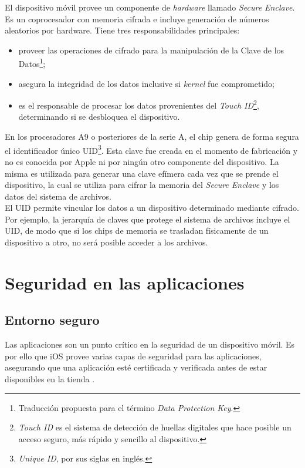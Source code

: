 El dispositivo móvil provee un componente de \textit{hardware} llamado \textit{Secure Enclave}. Es un coprocesador con memoria cifrada e incluye generación de números aleatorios por hardware. Tiene tres responsabilidades principales:
\begin{itemize}
    \item proveer las operaciones de cifrado para la manipulación de la Clave de los Datos\footnote{Traducción propuesta para el término \textit{Data Protection Key}.};
    \item asegura la integridad de los datos inclusive si \textit{kernel} fue comprometido;
    \item es el responsable de procesar los datos provenientes del \textit{Touch ID}\footnote{\textit{Touch ID} es el sistema de detección de huellas digitales que hace posible un acceso seguro, más rápido y sencillo al dispositivo.}, determinando si se desbloquea el dispositivo.
\end{itemize}
En los procesadores A9 o posteriores de la serie A, el chip genera de forma segura el identificador único UID\footnote{\textit{Unique ID}, por sus siglas en inglés.}. Esta clave fue creada en el momento de fabricación y no es conocida por Apple ni por ningún otro componente del dispositivo. La misma es utilizada para generar una clave efímera cada vez que se prende el dispositivo, la cual se utiliza para cifrar la memoria del \textit{Secure Enclave} y los datos del sistema de archivos.\\

El UID permite vincular los datos a un dispositivo determinado mediante cifrado. Por ejemplo, la jerarquía de claves que protege el sistema de archivos incluye el UID, de modo que si los chips de memoria se trasladan físicamente de un dispositivo a otro, no será posible acceder a los archivos.
\section{Seguridad en las aplicaciones}
\subsection{Entorno seguro}
Las aplicaciones son un punto crítico en la seguridad de un dispositivo móvil. Es por ello que iOS provee varias capas de seguridad para las aplicaciones, asegurando que una aplicación esté certificada y verificada antes de estar disponibles en la tienda \cite{asg}.\\

